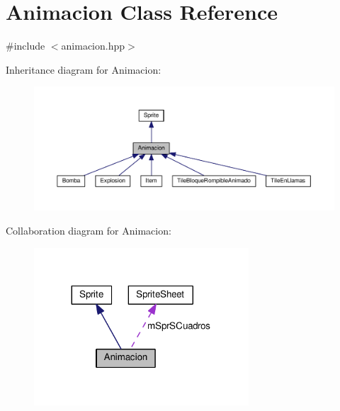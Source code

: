 \hypertarget{class_animacion}{}\section{Animacion Class Reference}
\label{class_animacion}


{\ttfamily \#include $<$animacion.\+hpp$>$}



Inheritance diagram for Animacion\+:
\nopagebreak
\begin{figure}[H]
\begin{center}
\leavevmode
\includegraphics[width=350pt]{class_animacion__inherit__graph}
\end{center}
\end{figure}


Collaboration diagram for Animacion\+:\nopagebreak
\begin{figure}[H]
\begin{center}
\leavevmode
\includegraphics[width=227pt]{class_animacion__coll__graph}
\end{center}
\end{figure}
